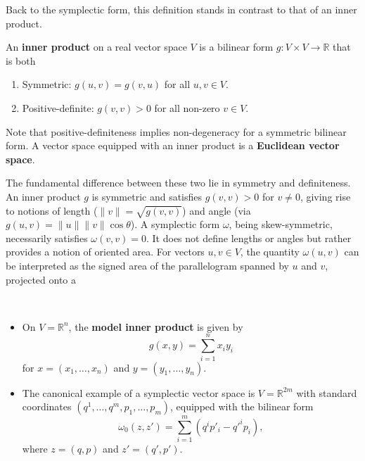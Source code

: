 Back to the symplectic form, this definition stands in contrast to that of an inner product.

\begin{definition}
An \textbf{inner product} on a real vector space $V$ is a bilinear form $g: V \times V \to \mathbb{R}$ that is both
\begin{enumerate}
    \item Symmetric: $g(u, v) = g(v, u)$ for all $u, v \in V$.
    \item Positive-definite: $g(v, v) > 0$ for all non-zero $v \in V$.
\end{enumerate}
\end{definition}

Note that positive-definiteness implies non-degeneracy for a symmetric bilinear form. A vector space equipped with an inner product is a \textbf{Euclidean vector space}.

The fundamental difference between these two lie in symmetry and definiteness. An inner product $g$ is symmetric and satisfies $g(v, v) > 0$ for $v \neq 0$, giving rise to notions of length ($\|v\| = \sqrt{g(v, v)}$) and angle (via $g(u, v) = \|u\| \|v\| \cos \theta$). A symplectic form $\omega$, being skew-symmetric, necessarily satisfies $\omega(v, v) = 0$. It does not define lengths or angles but rather provides a notion of oriented area. For vectors $u, v \in V$, the quantity $\omega(u, v)$ can be interpreted as the signed area of the parallelogram spanned by $u$ and $v$, projected onto a 

\begin{example}
\,
\begin{itemize}
    \item On $V = \mathbb{R}^n$, the \textbf{model inner product} is given by 
    \[g(x, y) = \sum_{i=1}^n x_i y_i\] 
    for $x = (x_1, \dots, x_n)$ and $y = (y_1, \dots, y_n)$.
    \item The canonical example of a symplectic vector space is $V = \mathbb{R}^{2m}$ with standard coordinates $(q^1, \dots, q^m, p_1, \dots, p_m)$, equipped with the bilinear form
    \[
    \omega_0(z, z') = \sum_{i=1}^m (q^i p'_i - q'^i p_i),
    \]
    where $z = (q, p)$ and $z' = (q', p')$.
\end{itemize}
\end{example}

